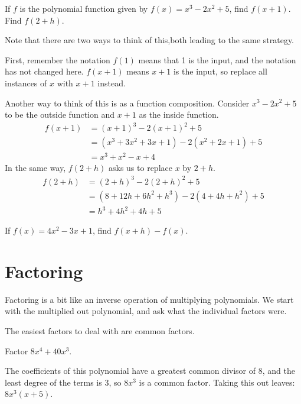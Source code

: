 \documentclass{ximera}
\begin{document}
\begin{example}
	If $f$ is the polynomial function given by $f(x) = x^3-2x^2 +5$, find $f(x+1)$.  Find $f(2+h)$.
	\begin{explanation}
		Note that there are two ways to think of this,both leading to the same strategy.

		First, remember the notation $f(1)$ means that 1 is the input, and the notation has not changed here. $f(x+1)$ means $x+1$ is the input, so replace all instances of $x$ with $x+1$ instead.
		
		Another way to think of this is as a function composition. Consider $x^3-2x^2+5$ to be the outside function and $x+1$ as the inside function.
		\begin{align*}
			f(x+1) &= (x+1)^3 - 2(x+1)^2 + 5 \\
				&= (x^3 + 3x^2 + 3x + 1) - 2(x^2 + 2x + 1) + 5\\
				&= x^3 + x^2 -x + 4
		\end{align*}
		In the same way, $f(2+h)$ asks us to replace $x$ by $2+h$.
		\begin{align*}
			f(2+h) &= (2+h)^3 - 2(2+h)^2 + 5\\
				&= (8+12h + 6h^2 + h^3) - 2(4+4h+h^2) + 5\\
				&= h^3 + 4h^2+4h+5
		\end{align*}
	\end{explanation}
\end{example}

\begin{problem}
	If $f(x)=4x^2-3x+1$, find $f(x+h)-f(x)$.
	\begin{multipleChoice}
	\end{multipleChoice}
\end{problem}

\section{Factoring}
Factoring is a bit like an inverse operation of multiplying polynomials.  We start with the multiplied out polynomial, and ask what the individual factors were.

The easiest factors to deal with are common factors.
\begin{example}
	Factor $8x^4 + 40x^3$.
	\begin{explanation}
		The coefficients of this polynomial have a greatest common divisor of $8$, and the least degree of the terms is $3$, so
		$8x^3$ is a common factor.  Taking this out leaves:
		$\displaystyle 8x^3( x+5)$.
	\end{explanation}
\end{example}
\end{document}
